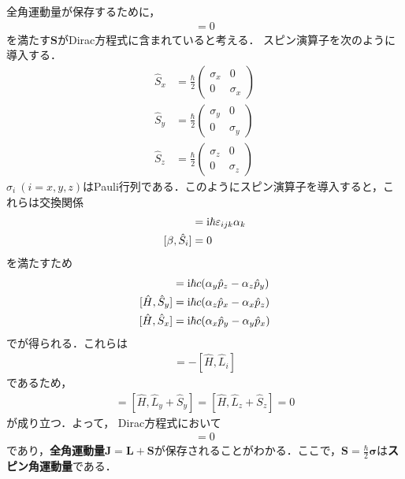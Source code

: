 \documentclass{report}
\begin{document}
  全角運動量が保存するために，
  \begin{align}
    [\hat{H}, \hat{\bm{L}} + \hat{\bm{S}}] = 0
  \end{align}
  を満たす$\bm{S}$がDirac方程式に含まれていると考える．
  スピン演算子を次のように導入する．
  \begin{align}
    \hat{S}_x &= \frac{\hbar}{2}
    \begin{pmatrix}
      \sigma_x & 0\\
      0& \sigma_x
    \end{pmatrix}\\
    \hat{S}_y &= \frac{\hbar}{2}
    \begin{pmatrix}
      \sigma_y & 0\\
      0& \sigma_y
    \end{pmatrix}\\
    \hat{S}_z &= \frac{\hbar}{2}
    \begin{pmatrix}
      \sigma_z & 0\\
      0& \sigma_z
    \end{pmatrix}
  \end{align}
  $\sigma_i\ (i=x,y,z)$はPauli行列である．このようにスピン演算子を導入すると，これらは交換関係
  \begin{align}
    [\alpha_i, \hat{S}_j] &= \i \hbar \epsilon_{ijk} \alpha_k\\
    [\beta, \hat{S}_i] &= 0
  \end{align}
  を満たすため
  \begin{align}
    [\hat{H}, \hat{S}_x] &= \i\hbar c(\alpha_y \hat{p}_z - \alpha_z \hat{p}_y)\\
    [\hat{H}, \hat{S}_y] &= \i\hbar c(\alpha_z \hat{p}_x - \alpha_x \hat{p}_z)\\
    [\hat{H}, \hat{S}_x] &= \i\hbar c(\alpha_x \hat{p}_y - \alpha_y \hat{p}_x)
  \end{align}
  でが得られる．これらは
  \begin{align}
    [\hat{H}, \hat{S}_i] = - [\hat{H}, \hat{L}_i]
  \end{align}
  であるため，
  \begin{align}
    [\hat{H}, \hat{L}_x + \hat{S}_x] = [\hat{H}, \hat{L}_y + \hat{S}_y] = [\hat{H}, \hat{L}_z + \hat{S}_z] = 0
  \end{align}
  が成り立つ．よって，
  Dirac方程式において
  \begin{align}
    [\hat{H}, \hat{\bm{L}} + \hat{\bm{S}}] = 0
  \end{align}
  であり，\textbf{全角運動量}$\bm{J} = \bm{L} + \bm{S}$が保存されることがわかる．ここで，$\bm{S} = \frac{\hbar}{2}\bm{\sigma}$は\textbf{スピン角運動量}である．
\end{document}
